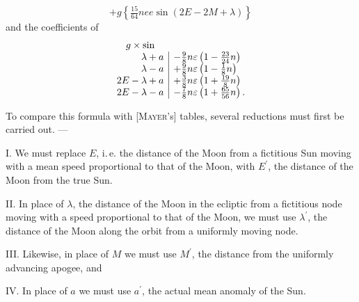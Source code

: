 \[
+g\left\{\tfrac{15}{64}nee\sin(2E-2M+\lambda)\right\}
\]
\noindent and the coefficients of
\[
\begin{array}{r|l}
\multicolumn{1}{c}{g\times\sin}&\\
\lambda+a&-\tfrac98n\varepsilon\left(1-\tfrac{23}{24}n\right)\\
\lambda-a&+\tfrac98n\varepsilon\left(1-\tfrac18n\right)\\
2E-\lambda+a&+\tfrac38n\varepsilon\left(1+\tfrac{19}{8}n\right)\\
2E-\lambda-a&-\tfrac78n\varepsilon\left(1+\tfrac{65}{56}n\right).
\end{array}
\]
\par\noindent\hspace*{\parindent}To compare this formula with [\textsc{Mayer}'s] tables,
several reductions must first be carried out. —

\par\noindent\hspace*{\parindent}I. We must replace \(E\), i.\,e. the distance of the Moon from a
fictitious Sun moving with a mean speed proportional to that of the Moon,
with \(E^{\prime}\), the distance of the Moon from the
true Sun.

\par\noindent\hspace*{\parindent}II. In place of \(\lambda\), the distance of the Moon in the ecliptic from a
fictitious node moving with a speed proportional to that of the Moon,
we must use \(\lambda^{\prime}\), the distance of the Moon along the orbit
from a uniformly moving node.

\par\noindent\hspace*{\parindent}III. Likewise, in place of \(M\) we must use \(M^{\prime}\), the distance from the uniformly advancing
apogee, and

\par\noindent\hspace*{\parindent}IV. In place of \(a\) we must use \(a^{\prime}\), the actual mean anomaly of the Sun.

